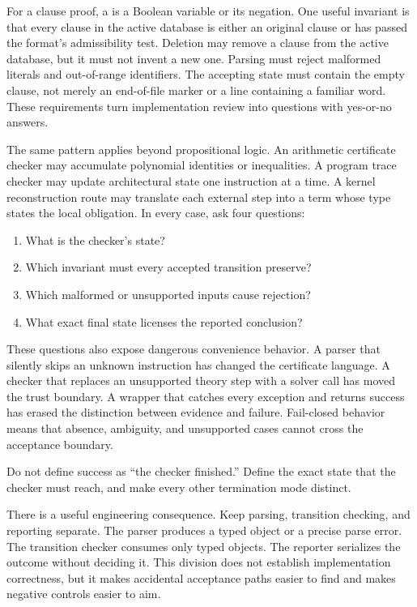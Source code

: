 For a clause proof, a  is a Boolean variable or its negation.
One useful invariant is that every clause in the active
database is either an original clause or has passed the format's admissibility
test. Deletion may remove a clause from the active database, but it must not
invent a new one. Parsing must reject malformed literals and out-of-range
identifiers. The accepting state must contain the empty clause, not merely an
end-of-file marker or a line containing a familiar word. These requirements
turn implementation review into questions with yes-or-no answers.

The same pattern applies beyond propositional logic. An arithmetic certificate
checker may accumulate polynomial identities or inequalities. A program trace
checker may update architectural state one instruction at a time. A kernel
reconstruction route may translate each external step into a term whose type
states the local obligation. In every case, ask four questions:

\begin{enumerate}
  \item What is the checker's state?
  \item Which invariant must every accepted transition preserve?
  \item Which malformed or unsupported inputs cause rejection?
  \item What exact final state licenses the reported conclusion?
\end{enumerate}

These questions also expose dangerous convenience behavior. A parser that
silently skips an unknown instruction has changed the certificate language. A
checker that replaces an unsupported theory step with a solver call has moved
the trust boundary. A wrapper that catches every exception and returns success
has erased the distinction between evidence and failure. Fail-closed behavior
means that absence, ambiguity, and unsupported cases cannot cross the
acceptance boundary.

\begin{keyidea}[title={The accepting state is part of the theorem}]
Do not define success as ``the checker finished.'' Define the exact state that
the checker must reach, and make every other termination mode distinct.
\end{keyidea}

There is a useful engineering consequence. Keep parsing, transition checking,
and reporting separate. The parser produces a typed object or a precise parse
error. The transition checker consumes only typed objects. The reporter
serializes the outcome without deciding it. This division does not establish
implementation correctness, but it makes accidental acceptance paths easier
to find and makes negative controls easier to aim.

